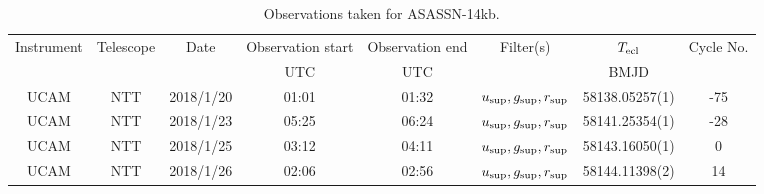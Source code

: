 \begin{table}
	\begin{center}
		\begin{tabular}{cccccccc}
			\hline
			Instrument & Telescope & Date & Observation start & Observation end & Filter(s) & $T_{\rm ecl}$ & Cycle No. \\
			 &  &  & UTC & UTC &  & BMJD &  \\
			\hline
			\hline
			UCAM & NTT & 2018/1/20 & 01:01 & 01:32 & $u_{\rm sup},g_{\rm sup},r_{\rm sup}$ & 58138.05257(1)                                                                                                            &                                         -75 \\
			UCAM & NTT & 2018/1/23 & 05:25 & 06:24 & $u_{\rm sup},g_{\rm sup},r_{\rm sup}$ & 58141.25354(1)                                                                                                            &                                         -28 \\
			UCAM & NTT & 2018/1/25 & 03:12 & 04:11 & $u_{\rm sup},g_{\rm sup},r_{\rm sup}$ & 58143.16050(1)                                                                                                            &                                           0 \\
			UCAM & NTT & 2018/1/26 & 02:06 & 02:56 & $u_{\rm sup},g_{\rm sup},r_{\rm sup}$ & 58144.11398(2)                                                                                                            &                                          14 \\
		   \hline
		\end{tabular}
	\end{center}
	\caption{Observations taken for ASASSN-14kb.}
	\label{table:observing:observation logs ASASSN-14kb}
\end{table}